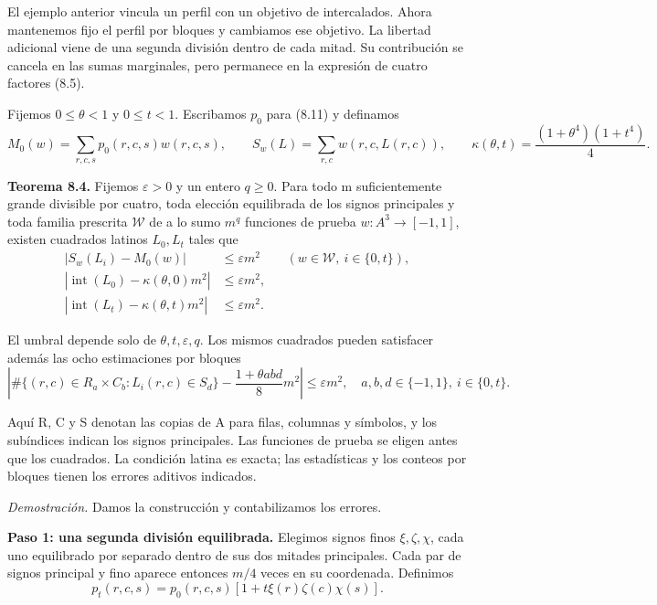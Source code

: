 \documentclass[spanish,11pt,a4paper]{article}
\begin{document}
El ejemplo anterior vincula un perfil con un objetivo de intercalados. Ahora mantenemos fijo el perfil por bloques y cambiamos ese objetivo. La libertad adicional viene de una segunda división dentro de cada mitad. Su contribución se cancela en las sumas marginales, pero permanece en la expresión de cuatro factores (8.5).

Fijemos \(0\leq\theta<1\) y \(0\leq t<1\). Escribamos \(p_0\) para (8.11) y definamos
\[M_0(w)=\sum_{r,c,s}p_0(r,c,s)w(r,c,s),\qquad
S_w(L)=\sum_{r,c}w(r,c,L(r,c)),\qquad
\kappa(\theta,t)=\frac{(1+\theta^4)(1+t^4)}4.                 \tag{8.16}\]

\textbf{Teorema 8.4.} Fijemos \(\varepsilon>0\) y un entero \(q\geq0\). Para todo m suficientemente grande divisible por cuatro, toda elección equilibrada de los signos principales y toda familia prescrita \(\mathcal W\) de a lo sumo \(m^q\) funciones de prueba \(w:A^3\to[-1,1]\), existen cuadrados latinos \(L_0,L_t\) tales que
\[\begin{aligned}
|S_w(L_i)-M_0(w)|&\leq\varepsilon m^2
&& (w\in\mathcal W,\ i\in\{0,t\}),\\
|\operatorname{int}(L_0)-\kappa(\theta,0)m^2|&\leq\varepsilon m^2,\\
|\operatorname{int}(L_t)-\kappa(\theta,t)m^2|&\leq\varepsilon m^2.
\end{aligned}                                                   \tag{8.17}\]

El umbral depende solo de \(\theta,t,\varepsilon,q\). Los mismos cuadrados pueden satisfacer además las ocho estimaciones por bloques
\[\left|\#\{(r,c)\in R_a\times C_b:L_i(r,c)\in S_d\}
       -\frac{1+\theta abd}{8}m^2\right|\leq\varepsilon m^2,
\quad a,b,d\in\{-1,1\},\ i\in\{0,t\}.                       \tag{8.18}\]

Aquí R, C y S denotan las copias de A para filas, columnas y símbolos, y los subíndices indican los signos principales. Las funciones de prueba se eligen antes que los cuadrados. La condición latina es exacta; las estadísticas y los conteos por bloques tienen los errores aditivos indicados.

\emph{Demostración.} Damos la construcción y contabilizamos los errores.

\textbf{Paso 1: una segunda división equilibrada.} Elegimos signos finos \(\xi,\zeta,\chi\), cada uno equilibrado por separado dentro de sus dos mitades principales. Cada par de signos principal y fino aparece entonces \(m/4\) veces en su coordenada. Definimos
\[p_t(r,c,s)=p_0(r,c,s)[1+t\xi(r)\zeta(c)\chi(s)].              \tag{8.19}\]
\end{document}
